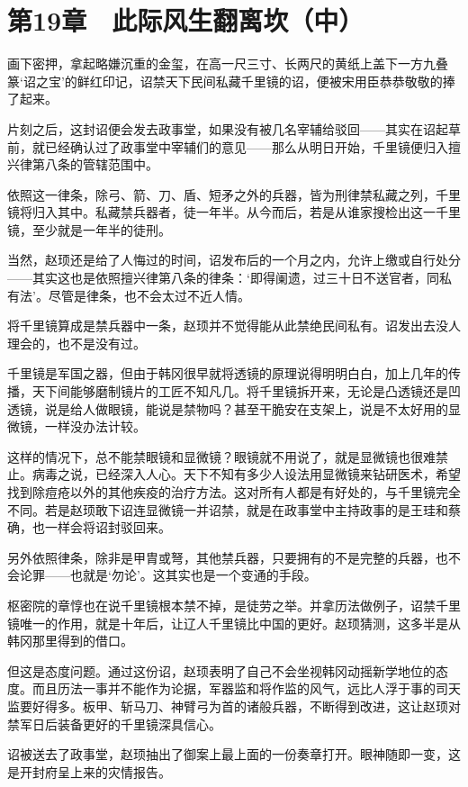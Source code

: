 \section{第19章　此际风生翻离坎（中）}

画下密押，拿起略嫌沉重的金玺，在高一尺三寸、长两尺的黄纸上盖下一方九叠篆‘诏之宝’的鲜红印记，诏禁天下民间私藏千里镜的诏，便被宋用臣恭恭敬敬的捧了起来。

片刻之后，这封诏便会发去政事堂，如果没有被几名宰辅给驳回——其实在诏起草前，就已经确认过了政事堂中宰辅们的意见——那么从明日开始，千里镜便归入擅兴律第八条的管辖范围中。

依照这一律条，除弓、箭、刀、盾、短矛之外的兵器，皆为刑律禁私藏之列，千里镜将归入其中。私藏禁兵器者，徒一年半。从今而后，若是从谁家搜检出这一千里镜，至少就是一年半的徒刑。

当然，赵顼还是给了人悔过的时间，诏发布后的一个月之内，允许上缴或自行处分——其实这也是依照擅兴律第八条的律条：‘即得阑遗，过三十日不送官者，同私有法’。尽管是律条，也不会太过不近人情。

将千里镜算成是禁兵器中一条，赵顼并不觉得能从此禁绝民间私有。诏发出去没人理会的，也不是没有过。

千里镜是军国之器，但由于韩冈很早就将透镜的原理说得明明白白，加上几年的传播，天下间能够磨制镜片的工匠不知凡几。将千里镜拆开来，无论是凸透镜还是凹透镜，说是给人做眼镜，能说是禁物吗？甚至干脆安在支架上，说是不太好用的显微镜，一样没办法计较。

这样的情况下，总不能禁眼镜和显微镜？眼镜就不用说了，就是显微镜也很难禁止。病毒之说，已经深入人心。天下不知有多少人设法用显微镜来钻研医术，希望找到除痘疮以外的其他疾疫的治疗方法。这对所有人都是有好处的，与千里镜完全不同。若是赵顼敢下诏连显微镜一并诏禁，就是在政事堂中主持政事的是王珪和蔡确，也一样会将诏封驳回来。

另外依照律条，除非是甲胄或弩，其他禁兵器，只要拥有的不是完整的兵器，也不会论罪——也就是‘勿论’。这其实也是一个变通的手段。

枢密院的章惇也在说千里镜根本禁不掉，是徒劳之举。并拿历法做例子，诏禁千里镜唯一的作用，就是十年后，让辽人千里镜比中国的更好。赵顼猜测，这多半是从韩冈那里得到的借口。

但这是态度问题。通过这份诏，赵顼表明了自己不会坐视韩冈动摇新学地位的态度。而且历法一事并不能作为论据，军器监和将作监的风气，远比人浮于事的司天监要好得多。板甲、斩马刀、神臂弓为首的诸般兵器，不断得到改进，这让赵顼对禁军日后装备更好的千里镜深具信心。

诏被送去了政事堂，赵顼抽出了御案上最上面的一份奏章打开。眼神随即一变，这是开封府呈上来的灾情报告。

